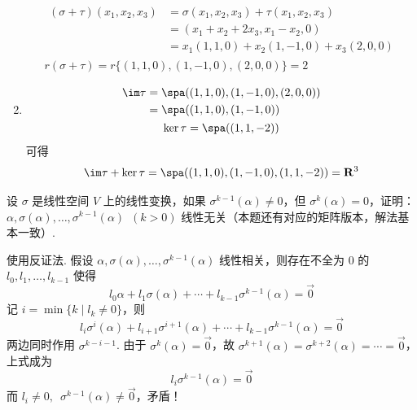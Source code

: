 \begin{exercise}
\begin{exgroup}
\begin{answer}
\begin{enumerate}
                      \begin{gather*}
                          \begin{aligned}
                              (\sigma + \tau)(x_1, x_2, x_3) & = \sigma(x_1, x_2, x_3) + \tau(x_1, x_2, x_3) \\
                                                             & = (x_1 + x_2 + 2 x_3, x_1 - x_2, 0)           \\
                                                             & = x_1(1, 1, 0) + x_2(1, -1, 0) + x_3(2, 0, 0)
                          \end{aligned} \\
                          r(\sigma + \tau) = r\{(1, 1, 0), (1, -1, 0), (2, 0, 0)\} = 2
                      \end{gather*}

                \item \begin{gather*}
                          \begin{aligned}
                              \im \tau & = \spa((1, 1, 0), (1, -1, 0), (2, 0, 0)) \\
                                       & = \spa((1, 1, 0), (1, -1, 0))
                          \end{aligned} \\
                          \ker \tau = \spa((1, 1, -2))
                      \end{gather*}
                      可得
                      \[ \im \tau + \ker \tau = \spa((1, 1, 0), (1, -1, 0), (1, 1, -2)) = \mathbf{R}^3 \]
            \end{enumerate}
        \end{answer}

        \item 设 $\sigma$ 是线性空间 $V$ 上的线性变换，如果 $\sigma^{k-1}(\alpha) \neq 0$，但 $\sigma^{k}(\alpha) = 0$，证明：\\
        $\alpha,\sigma(\alpha),\ldots,\sigma^{k-1}(\alpha)\enspace(k>0)$ 线性无关（本题还有对应的矩阵版本，解法基本一致）.

        \begin{answer}
            使用反证法. 假设 $ \alpha, \sigma(\alpha), \ldots, \sigma^{k - 1}(\alpha) $ 线性相关，则存在不全为 0 的 $ l_0, l_1, \ldots, l_{k - 1} $ 使得
          \[ l_0 \alpha + l_1 \sigma(\alpha) + \cdots + l_{k - 1} \sigma^{k - 1}(\alpha) = \vec{0} \]
          记 $ i = \min\{k \mid l_k \neq 0\} $，则
          \[ l_i \sigma^{i}(\alpha) + l_{i + 1} \sigma^{i + 1}(\alpha) + \cdots + l_{k - 1} \sigma^{k - 1}(\alpha) = \vec{0} \]
          两边同时作用 $ \sigma^{k - i - 1} $. 由于 $ \sigma^{k}(\alpha) = \vec{0} $，故 $ \sigma^{k + 1}(\alpha) = \sigma^{k + 2}(\alpha) = \cdots = \vec{0} $，上式成为
          \[ l_i \sigma^{k - 1}(\alpha) = \vec{0} \]
          而 $ l_i \neq 0,\enspace \sigma^{k - 1}(\alpha) \neq \vec{0} $，矛盾！


\end{answer}
\end{exgroup}
\end{exercise}
